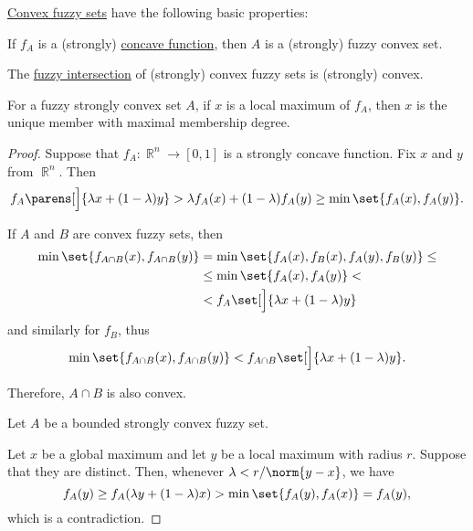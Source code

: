 \begin{proposition}\label{thm:def:convex_fuzzy_set}
  \hyperref[def:convex_fuzzy_set]{Convex fuzzy sets} have the following basic properties:
  \begin{thmenum}
     If \( f_A \) is a (strongly) \hyperref[def:convex_function]{concave function}, then \( A \) is a (strongly) fuzzy convex set.

     The \hyperref[def:basic_fuzzy_set_operations/intersection]{fuzzy intersection} of (strongly) convex fuzzy sets is (strongly) convex.

     For a fuzzy strongly convex set \( A \), if \( x \) is a local maximum of \( f_A \), then \( x \) is the unique member with maximal membership degree.
  \end{thmenum}
\end{proposition}
\begin{proof}
   Suppose that \( f_A: \BbbR^n \to [0, 1] \) is a strongly concave function. Fix \( x \) and \( y \) from \( \BbbR^n \). Then
  \begin{equation*}
    f_A\parens[\Big]{ \lambda x + (1 - \lambda) y }
    >
    \lambda f_A(x) + (1 - \lambda) f_A(y)
    \geq
    \min\set{ f_A(x), f_A(y) }.
  \end{equation*}

   If \( A \) and \( B \) are convex fuzzy sets, then
  \begin{align*}
    \min\set{ f_{A \cap B}(x), f_{A \cap B}(y) }
    &=
    \min\set{ f_A(x), f_B(x), f_A(y), f_B(y) }
    \leq \\ &\leq
    \min\set{ f_A(x), f_A(y) }
    < \\ &<
    f_A \set[\Big]{ \lambda x + (1 - \lambda) y }
  \end{align*}
  and similarly for \( f_B \), thus
  \begin{equation*}
    \min\set{ f_{A \cap B}(x), f_{A \cap B}(y) }
    <
    f_{A \cap B} \set[\Big]{ \lambda x + (1 - \lambda) y }.
  \end{equation*}

  Therefore, \( A \cap B \) is also convex.

   Let \( A \) be a bounded strongly convex fuzzy set.

  Let \( x \) be a global maximum and let \( y \) be a local maximum with radius \( r \). Suppose that they are distinct. Then, whenever \( \lambda < r / \norm{y - x} \), we have
  \begin{equation*}
    f_A(y)
    \geq
    f_A(\lambda y + (1 - \lambda) x)
    >
    \min\set{ f_A(y), f_A(x) }
    =
    f_A(y),
  \end{equation*}
  which is a contradiction.
\end{proof}

